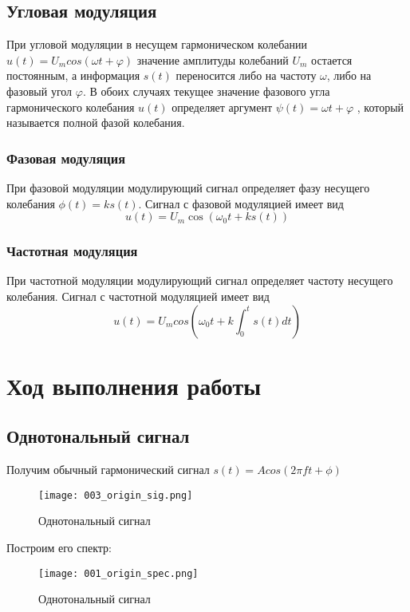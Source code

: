 \subsection{Угловая модуляция}

При угловой модуляции в несущем гармоническом колебании $u(t) = U_m cos(\omega t + \varphi)$ 
значение амплитуды колебаний $U_m$ остается постоянным, а информация $s(t)$ переносится либо на частоту $\omega$, 
либо на фазовый угол $\varphi$. В обоих случаях текущее значение фазового угла гармонического 
колебания $u(t)$ определяет аргумент $\psi (t) = \omega t + \varphi$ ,
который называется полной фазой колебания.

\subsubsection{Фазовая модуляция}
При фазовой модуляции модулирующий сигнал определяет фазу несущего колебания
$\phi(t) = k s(t)$. Сигнал с фазовой модуляцией имеет вид 
\begin{equation}
    u(t) = U_m \cos(\omega_0 t + k s(t))
\end{equation}


\subsubsection{Частотная модуляция}
При частотной модуляции модулирующий сигнал определяет частоту несущего колебания.
Сигнал с частотной модуляцией имеет вид  
\begin{equation}
	u(t) = U_m cos(\omega_0 t + k \int_{0}^{t} s(t) dt)
\end{equation}

\section{Ход выполнения работы}

\subsection{Однотональный сигнал}
Получим обычный гармонический сигнал  $s(t) = Acos(2 \pi ft + \phi)$ 
\begin{figure}[H]
	\begin{center}
		\texttt{[image: 003\_origin\_sig.png]}
		\caption{Однотональный сигнал} 
		\label{pic:001} %
	\end{center}
\end{figure}
Построим его спектр:
\begin{figure}[H]
	\begin{center}
		\texttt{[image: 001\_origin\_spec.png]}
		\caption{Однотональный сигнал} 
		\label{pic:002} %
	\end{center}
\end{figure}

